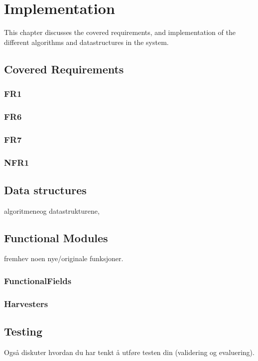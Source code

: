 
\chapter{Implementation}

\minitoc

This chapter discusses the covered requirements, and implementation of the different algorithms and datastructures in the system.

\clearpage

\section{Covered Requirements}
\subsection{FR1}
\subsection{FR6}
\subsection{FR7}
\subsection{NFR1}

\section{Data structures}
algoritmeneog datastrukturene,

\section{Functional Modules}
fremhev noen nye/originale funksjoner.
\subsection{FunctionalFields}
\subsection{Harvesters}

\section{Testing}
Også diskuter hvordan du har tenkt å utføre testen din (validering og evaluering).
